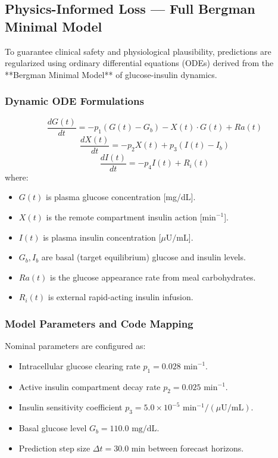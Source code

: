 \documentclass[10pt,journal,compsoc,twocolumn]{IEEEtran}
\begin{document}
\subsection{Physics-Informed Loss — Full Bergman Minimal Model}
To guarantee clinical safety and physiological plausibility, predictions are regularized using ordinary differential equations (ODEs) derived from the **Bergman Minimal Model** of glucose-insulin dynamics.

\subsubsection{Dynamic ODE Formulations}
\begin{equation}
\frac{dG(t)}{dt} = -p_1 \left(G(t) - G_b\right) - X(t) \cdot G(t) + Ra(t)
\end{equation}
\begin{equation}
\frac{dX(t)}{dt} = -p_2 X(t) + p_3 \left(I(t) - I_b\right)
\end{equation}
\begin{equation}
\frac{dI(t)}{dt} = -p_4 I(t) + R_i(t)
\end{equation}
where:
\begin{itemize}
    \item $G(t)$ is plasma glucose concentration [mg/dL].
    \item $X(t)$ is the remote compartment insulin action [$\text{min}^{-1}$].
    \item $I(t)$ is plasma insulin concentration [$\mu\text{U/mL}$].
    \item $G_b, I_b$ are basal (target equilibrium) glucose and insulin levels.
    \item $Ra(t)$ is the glucose appearance rate from meal carbohydrates.
    \item $R_i(t)$ is external rapid-acting insulin infusion.
\end{itemize}

\subsubsection{Model Parameters and Code Mapping}
Nominal parameters are configured as:
\begin{itemize}
    \item Intracellular glucose clearing rate $p_1 = 0.028 \text{ min}^{-1}$.
    \item Active insulin compartment decay rate $p_2 = 0.025 \text{ min}^{-1}$.
    \item Insulin sensitivity coefficient $p_3 = 5.0 \times 10^{-5} \text{ min}^{-1}/(\mu\text{U/mL})$.
    \item Basal glucose level $G_b = 110.0 \text{ mg/dL}$.
    \item Prediction step size $\Delta t = 30.0\text{ min}$ between forecast horizons.
\end{itemize}
\end{document}
